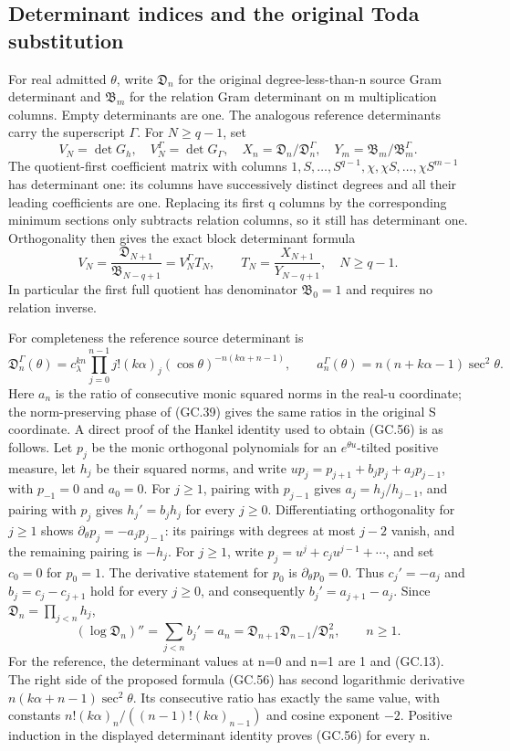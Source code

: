 \subsection{Determinant indices and the original Toda substitution}

For real admitted $\theta$, write $\mathfrak D_n$ for the original
degree-less-than-n source Gram determinant and $\mathfrak B_m$ for
the relation Gram determinant on m multiplication columns. Empty
determinants are one. The analogous reference determinants carry
the superscript $\Gamma$. For $N\ge q-1$, set
\[
 V_N=\det G_h,\quad V_N^\Gamma=\det G_\Gamma,
 \quad X_n=\mathfrak D_n/\mathfrak D_n^\Gamma,
 \quad Y_m=\mathfrak B_m/\mathfrak B_m^\Gamma.
\]
The quotient-first coefficient matrix with columns
$1,S,\ldots,S^{q-1},\chi,\chi S,\ldots,\chi S^{m-1}$
has determinant one: its columns have successively distinct degrees
and all their leading coefficients are one. Replacing its first q
columns by the corresponding minimum sections only subtracts
relation columns, so it still has determinant one. Orthogonality
then gives the exact block determinant formula
\[
 V_N=\frac{\mathfrak D_{N+1}}{\mathfrak B_{N-q+1}}
     =V_N^\Gamma T_N,\qquad
 T_N=\frac{X_{N+1}}{Y_{N-q+1}},\quad N\ge q-1.                  \tag{GC.55}
\]
In particular the first full quotient has denominator
$\mathfrak B_0=1$ and requires no relation inverse.

For completeness the reference source determinant is
\[
 \mathfrak D_n^\Gamma(\theta)=c_\lambda^{kn}
  \prod_{j=0}^{n-1}j!(k\alpha)_j
             (\cos\theta)^{-n(k\alpha+n-1)},
 \qquad
 a_n^\Gamma(\theta)=n(n+k\alpha-1)\sec^2\theta.                \tag{GC.56}
\]
Here $a_n$ is the ratio of consecutive monic squared norms in the
real-u coordinate; the norm-preserving phase of (GC.39) gives the
same ratios in the original S coordinate. A direct proof of the
Hankel identity used to obtain (GC.56) is as follows. Let $p_j$ be
the monic orthogonal polynomials for an $e^{\theta u}$-tilted
positive measure, let $h_j$ be their squared norms, and write
$up_j=p_{j+1}+b_jp_j+a_jp_{j-1}$, with $p_{-1}=0$ and $a_0=0$.
For $j\ge1$, pairing with $p_{j-1}$ gives
$a_j=h_j/h_{j-1}$, and pairing with $p_j$ gives $h_j'=b_jh_j$
for every $j\ge0$. Differentiating orthogonality for $j\ge1$ shows
$\partial_\theta p_j=-a_jp_{j-1}$: its pairings with degrees at
most $j-2$ vanish, and the remaining pairing is $-h_j$.
For $j\ge1$, write $p_j=u^j+c_ju^{j-1}+\cdots$, and set
$c_0=0$ for $p_0=1$. The derivative statement for $p_0$ is
$\partial_\theta p_0=0$. Thus $c_j'=-a_j$ and
$b_j=c_j-c_{j+1}$ hold for every $j\ge0$, and consequently
$b_j'=a_{j+1}-a_j$.
Since $\mathfrak D_n=\prod_{j<n}h_j$,
\[
 (\log\mathfrak D_n)''=\sum_{j<n}b_j'=a_n
   =\mathfrak D_{n+1}\mathfrak D_{n-1}/\mathfrak D_n^2,
   \qquad n\ge1.
\]
For the reference, the determinant values at n=0 and n=1 are 1
and (GC.13). The right side of the proposed formula (GC.56) has
second logarithmic derivative $n(k\alpha+n-1)\sec^2\theta$.
Its consecutive ratio has exactly the same value, with constants
$n!(k\alpha)_n/((n-1)!(k\alpha)_{n-1})$ and cosine exponent
$-2$. Positive induction in the displayed determinant identity
proves (GC.56) for every n.

